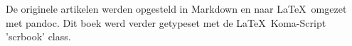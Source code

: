\mbox{}
\vfill
De originele artikelen werden opgesteld in Markdown
en naar \LaTeX\ omgezet met pandoc.
Dit boek werd verder getypeset met de \LaTeX\ Koma-Script 'scrbook' class.
\doclicenseThis
